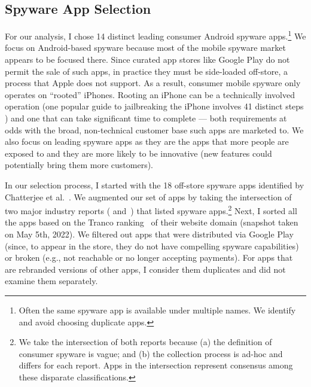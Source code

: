 \subsection{Spyware App Selection}
\label{subsec:app_selection}



For our analysis, I chose 14 distinct leading consumer Android spyware
apps.\footnote{Often the same spyware app is available under multiple
  names. We identify and avoid choosing duplicate apps.}  We focus on
Android-based spyware because most of the mobile spyware market
appears to be focused there. Since curated app stores like Google Play do not permit
the sale of such apps, in practice they must be side-loaded off-store, a process
that Apple does not support.  As a result, consumer mobile spyware only operates on ``rooted'' iPhones.  Rooting an iPhone can be a
technically involved operation (one popular guide to jailbreaking the
iPhone involves 41 distinct steps \cite{howToJailbreakIphone:online}) and one that can take significant
time to complete --- both requirements at odds with the broad,
non-technical customer base such apps are marketed to. We also focus on leading spyware apps as they are the apps that more people are exposed to and they are more likely to be innovative (new features could potentially bring them more customers).

In our selection process, I started with the 18 off-store spyware apps identified by Chatterjee et al.~\cite{chatterjee2018spyware}. We augmented our set of apps by taking the intersection of two major industry reports (\cite{esetandr4:online} and~\cite{Tekstalk86:online}) that listed spyware apps.\footnote{We take the intersection of both reports because (a) the definition of consumer spyware is vague; and (b) the collection process is ad-hoc and differs for each report. Apps in the intersection represent consensus among these disparate classifications.} Next, I sorted all the apps based on the Tranco ranking~\cite{pochat2018tranco} of their website domain (snapshot taken on May 5th, 2022).  We filtered out apps that were distributed via Google Play (since, to appear in
the store, they do not have compelling spyware capabilities)
or broken (e.g., not reachable or no longer accepting payments).
For apps that are rebranded versions of other apps, I consider them duplicates and did not examine them separately.

